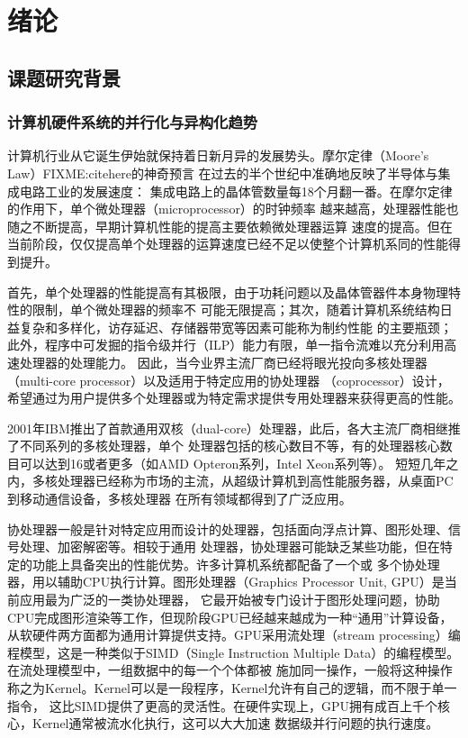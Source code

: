 \chapter{绪论}

\section{课题研究背景}

\subsection{计算机硬件系统的并行化与异构化趋势}
计算机行业从它诞生伊始就保持着日新月异的发展势头。摩尔定律（Moore's Law）FIXME:citehere的神奇预言
在过去的半个世纪中准确地反映了半导体与集成电路工业的发展速度：
集成电路上的晶体管数量每18个月翻一番。在摩尔定律的作用下，单个微处理器（microprocessor）的时钟频率
越来越高，处理器性能也随之不断提高，早期计算机性能的提高主要依赖微处理器运算
速度的提高。但在当前阶段，仅仅提高单个处理器的运算速度已经不足以使整个计算机系同的性能得到提升。

首先，单个处理器的性能提高有其极限，由于功耗问题以及晶体管器件本身物理特性的限制，单个微处理器的频率不
可能无限提高；其次，随着计算机系统结构日益复杂和多样化，访存延迟、存储器带宽等因素可能称为制约性能
的主要瓶颈；此外，程序中可发掘的指令级并行（ILP）能力有限，单一指令流难以充分利用高速处理器的处理能力。
因此，当今业界主流厂商已经将眼光投向多核处理器（multi-core processor）以及适用于特定应用的协处理器
（coprocessor）设计，希望通过为用户提供多个处理器或为特定需求提供专用处理器来获得更高的性能。

2001年IBM推出了首款通用双核（dual-core）处理器，此后，各大主流厂商相继推了不同系列的多核处理器，单个
处理器包括的核心数目不等，有的处理器核心数目可以达到16或者更多（如AMD Opteron系列，Intel Xeon系列等）。
短短几年之内，多核处理器已经称为市场的主流，从超级计算机到高性能服务器，从桌面PC到移动通信设备，多核处理器
在所有领域都得到了广泛应用。

协处理器一般是针对特定应用而设计的处理器，包括面向浮点计算、图形处理、信号处理、加密解密等。相较于通用
处理器，协处理器可能缺乏某些功能，但在特定的功能上具备突出的性能优势。许多计算机系统都配备了一个或
多个协处理器，用以辅助CPU执行计算。图形处理器（Graphics Processor Unit, GPU）是当前应用最为广泛的一类协处理器，
它最开始被专门设计于图形处理问题，协助CPU完成图形渲染等工作，但现阶段GPU已经越来越成为一种“通用”计算设备，
从软硬件两方面都为通用计算提供支持。GPU采用流处理（stream processing）编程模型，这是一种类似于SIMD（Single
Instruction Multiple Data）的编程模型。在流处理模型中，一组数据中的每一个个体都被
施加同一操作，一般将这种操作称之为Kernel。Kernel可以是一段程序，Kernel允许有自己的逻辑，而不限于单一指令，
这比SIMD提供了更高的灵活性。在硬件实现上，GPU拥有成百上千个核心，Kernel通常被流水化执行，这可以大大加速
数据级并行问题的执行速度。

